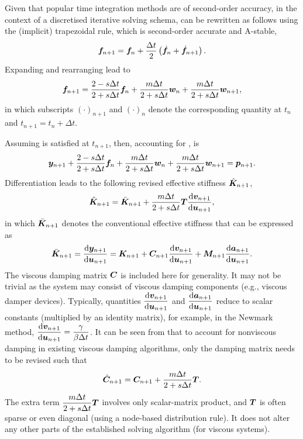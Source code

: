 Given that popular time integration methods are of second-order accuracy, in the context of a discretised iterative solving schema,  can be rewritten as follows using the (implicit) trapezoidal rule, which is second-order accurate and A-stable,
\begin{gather}
\bm{f}_{n+1}=\bm{f}_n+\dfrac{\Delta{}t}{2}\left(\dot{\bm{f}}_n+\dot{\bm{f}}_{n+1}\right).
\end{gather}
Expanding and rearranging lead to
\begin{gather}\label{eq:discretised_c}
\bm{f}_{n+1}=\dfrac{2-s\Delta{}t}{2+s\Delta{}t}\bm{f}_n+\dfrac{m\Delta{}t}{2+s\Delta{}t}\bm{w}_n+\dfrac{m\Delta{}t}{2+s\Delta{}t}\bm{w}_{n+1},
\end{gather}
in which subscripts $\left(\cdot\right)_{n+1}$ and $\left(\cdot\right)_n$ denote the corresponding quantity at $t_n$ and $t_{n+1}=t_n+\Delta{}t$.

Assuming  is satisfied at $t_{n+1}$, then, accounting for ,  is
\begin{gather}\label{eq:residual}
\bm{y}_{n+1}+\dfrac{2-s\Delta{}t}{2+s\Delta{}t}\bm{f}_n+\dfrac{m\Delta{}t}{2+s\Delta{}t}\bm{w}_n+\dfrac{m\Delta{}t}{2+s\Delta{}t}\bm{w}_{n+1}=\bm{p}_{n+1}.
\end{gather}
Differentiation leads to the following revised effective stiffness $\hat{\bm{K}}_{n+1}$,
\begin{gather}\label{eq:revised_k}
\hat{\bm{K}}_{n+1}=\bar{\bm{K}}_{n+1}+\dfrac{m\Delta{}t}{2+s\Delta{}t}\bm{T}\dfrac{\mathrm{d}\bm{v}_{n+1}}{\mathrm{d}\bm{u}_{n+1}},
\end{gather}
in which $\bar{\bm{K}}_{n+1}$ denotes the conventional effective stiffness that can be expressed as
\begin{gather}
\bar{\bm{K}}_{n+1}=\dfrac{\mathrm{d}\bm{y}_{n+1}}{\mathrm{d}\bm{u}_{n+1}}=\bm{K}_{n+1}+\bm{C}_{n+1}\dfrac{\mathrm{d}\bm{v}_{n+1}}{\mathrm{d}\bm{u}_{n+1}}+\bm{M}_{n+1}\dfrac{\mathrm{d}\bm{a}_{n+1}}{\mathrm{d}\bm{u}_{n+1}}.
\end{gather}
The viscous damping matrix $\bm{C}$ is included here for generality. It may not be trivial as the system may consist of viscous damping components (e.g., viscous damper devices). Typically, quantities $\dfrac{\mathrm{d}\bm{v}_{n+1}}{\mathrm{d}\bm{u}_{n+1}}$ and $\dfrac{\mathrm{d}\bm{a}_{n+1}}{\mathrm{d}\bm{u}_{n+1}}$ reduce to scalar constants (multiplied by an identity matrix), for example, in the Newmark method, $\dfrac{\mathrm{d}\bm{v}_{n+1}}{\mathrm{d}\bm{u}_{n+1}}=\dfrac{\gamma}{\beta\Delta{}t}$. It can be seen from  that to account for nonviscous damping in existing viscous damping algorithms, only the damping matrix needs to be revised such that
\begin{gather}
\hat{\bm{C}}_{n+1}=\bm{C}_{n+1}+\dfrac{m\Delta{}t}{2+s\Delta{}t}\bm{T}.
\end{gather}
The extra term $\dfrac{m\Delta{}t}{2+s\Delta{}t}\bm{T}$ involves only scalar-matrix product, and $\bm{T}$ is often sparse or even diagonal (using a node-based distribution rule). It does not alter any other parts of the established solving algorithm (for viscous systems).

